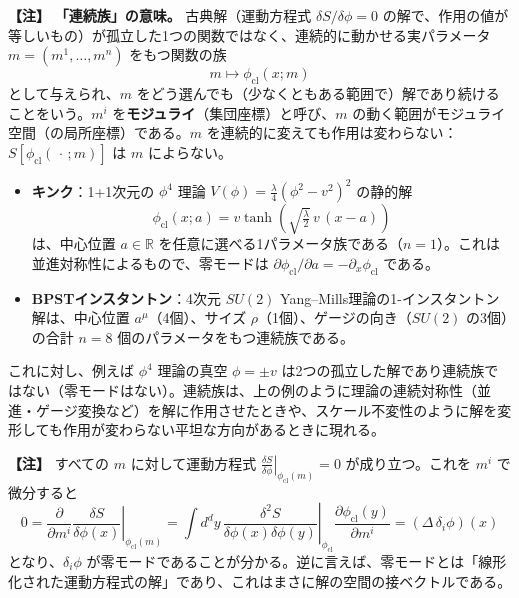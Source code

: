 \documentclass[uplatex, dvipdfmx, book]{jsbook}
\newenvironment{note}{\vspace{1ex}\par\footnotesize\noindent\textbf{【注】}}{\par\vspace{1ex}}
\begin{document}
\begin{note}
    \textbf{「連続族」の意味。}
    古典解（運動方程式 $\delta S/\delta\phi=0$ の解で、作用の値が等しいもの）が孤立した1つの関数ではなく、連続的に動かせる実パラメータ $m=(m^1,\dots,m^n)$ をもつ関数の族
    \[
        m \longmapsto \phi_{\text{cl}}(x;m)
    \]
    として与えられ、$m$ をどう選んでも（少なくともある範囲で）解であり続けることをいう。$m^i$ を\textbf{モジュライ}（集団座標）と呼び、$m$ の動く範囲がモジュライ空間（の局所座標）である。$m$ を連続的に変えても作用は変わらない：$S[\phi_{\text{cl}}(\,\cdot\,;m)]$ は $m$ によらない。
    \begin{itemize}
        \item \textbf{キンク}：1+1次元の $\phi^4$ 理論 $V(\phi)=\frac{\lambda}{4}(\phi^2-v^2)^2$ の静的解
        \[
            \phi_{\text{cl}}(x;a) = v\tanh\!\left(\sqrt{\tfrac{\lambda}{2}}\,v\,(x-a)\right)
        \]
        は、中心位置 $a\in\mathbb{R}$ を任意に選べる1パラメータ族である（$n=1$）。これは並進対称性によるもので、零モードは $\partial\phi_{\text{cl}}/\partial a=-\partial_x\phi_{\text{cl}}$ である。
        \item \textbf{BPSTインスタントン}：4次元 $SU(2)$ Yang--Mills理論の1-インスタントン解は、中心位置 $a^\mu$（4個）、サイズ $\rho$（1個）、ゲージの向き（$SU(2)$ の3個）の合計 $n=8$ 個のパラメータをもつ連続族である。
    \end{itemize}
    これに対し、例えば $\phi^4$ 理論の真空 $\phi=\pm v$ は2つの孤立した解であり連続族ではない（零モードはない）。連続族は、上の例のように理論の連続対称性（並進・ゲージ変換など）を解に作用させたときや、スケール不変性のように解を変形しても作用が変わらない平坦な方向があるときに現れる。
\end{note}

\begin{note}
すべての $m$ に対して運動方程式 $\left.\frac{\delta S}{\delta \phi}\right|_{\phi_{\text{cl}}(m)} = 0$ が成り立つ。これを $m^i$ で微分すると
\begin{equation}
    0 = \frac{\partial}{\partial m^i}\left.\frac{\delta S}{\delta \phi(x)}\right|_{\phi_{\text{cl}}(m)} = \int d^dy\, \left.\frac{\delta^2 S}{\delta \phi(x)\delta\phi(y)}\right|_{\phi_{\text{cl}}} \frac{\partial \phi_{\text{cl}}(y)}{\partial m^i} = (\Delta\, \delta_i\phi)(x)
\end{equation}
となり、$\delta_i\phi$ が零モードであることが分かる。逆に言えば、零モードとは「線形化された運動方程式の解」であり、これはまさに解の空間の接ベクトルである。
\end{note}
\end{document}
